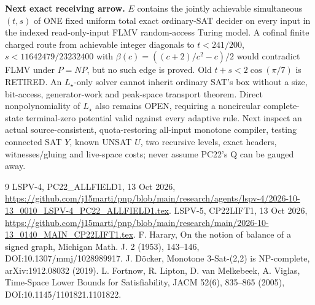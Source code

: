 \documentclass[11pt]{article}
\begin{document}
\textbf{Next exact receiving arrow.} $E$ contains the jointly achievable simultaneous $(t,s)$ of ONE fixed uniform total exact ordinary-SAT decider on every input in the indexed read-only-input FLMV random-access Turing model. A cofinal finite charged route from achievable integer diagonals to $t<241/200$, $s<11642479/23232400$ with $\beta(c)=((c+2)/c^2-c)/2$ would contradict FLMV under $P=NP$, but no such edge is proved. Old $t+s<2\cos(\pi/7)$ is RETIRED. An $L_\star$-only solver cannot inherit ordinary SAT's box without a size, bit-access, generator-work and peak-space transport theorem. Direct nonpolynomiality of $L_\star$ also remains OPEN, requiring a noncircular complete-state terminal-zero potential valid against every adaptive rule. Next inspect an actual source-consistent, quota-restoring all-input monotone compiler, testing connected SAT $Y$, known UNSAT $U$, two recursive levels, exact headers, witnesses/gluing and live-space costs; never assume PC22's Q can be gauged away.

\begin{thebibliography}{9}
 LSPV-4, PC22\_ALLFIELD1, 13 Oct 2026, \url{https://github.com/j15marti/pnp/blob/main/research/agents/lspv-4/2026-10-13_0010_LSPV-4_PC22_ALLFIELD1.tex}.
 LSPV-5, CP22LIFT1, 13 Oct 2026, \url{https://github.com/j15marti/pnp/blob/main/research/main/2026-10-13_0140_MAIN_CP22LIFT1.tex}.
 F. Harary, On the notion of balance of a signed graph, Michigan Math. J. 2 (1953), 143--146, DOI:10.1307/mmj/1028989917.
 J. D\"ocker, Monotone 3-Sat-(2,2) is NP-complete, arXiv:1912.08032 (2019).
 L. Fortnow, R. Lipton, D. van Melkebeek, A. Viglas, Time-Space Lower Bounds for Satisfiability, JACM 52(6), 835--865 (2005), DOI:10.1145/1101821.1101822.
\end{thebibliography}
\end{document}
